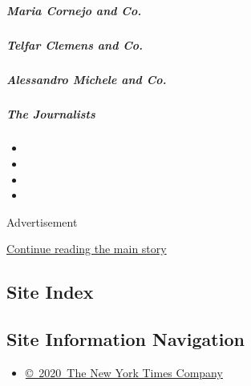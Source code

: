 \href{/interactive/2020/04/13/t-magazine/maria-cornejo-olivier-rousteing-telfar-clemens-alessandro-michele.html\#maria-cornejo-and-co}{}

\hypertarget{maria-cornejo-and-co}{%
\subparagraph{Maria Cornejo and Co.}\label{maria-cornejo-and-co}}

\href{/interactive/2020/04/13/t-magazine/maria-cornejo-olivier-rousteing-telfar-clemens-alessandro-michele.html\#telfar-clemens-and-co}{}

\hypertarget{telfar-clemens-and-co}{%
\subparagraph{Telfar Clemens and Co.}\label{telfar-clemens-and-co}}

\href{/interactive/2020/04/13/t-magazine/maria-cornejo-olivier-rousteing-telfar-clemens-alessandro-michele.html\#alessandro-michele-and-co}{}

\hypertarget{alessandro-michele-and-co}{%
\subparagraph{Alessandro Michele and
Co.}\label{alessandro-michele-and-co}}

\href{/interactive/2020/04/13/t-magazine/foreign-correspondents.html}{}

\hypertarget{the-journalists-1}{%
\subparagraph{The Journalists}\label{the-journalists-1}}

\begin{itemize}
\item
\item
\item
\item
\end{itemize}

Advertisement

\protect\hyperlink{after-bottom}{Continue reading the main story}

\hypertarget{site-index}{%
\subsection{Site Index}\label{site-index}}

\hypertarget{site-information-navigation}{%
\subsection{Site Information
Navigation}\label{site-information-navigation}}

\begin{itemize}
\tightlist
\item
  \href{https://help.nytimes.com/hc/en-us/articles/115014792127-Copyright-notice}{©~2020~The
  New York Times Company}
\end{itemize}


